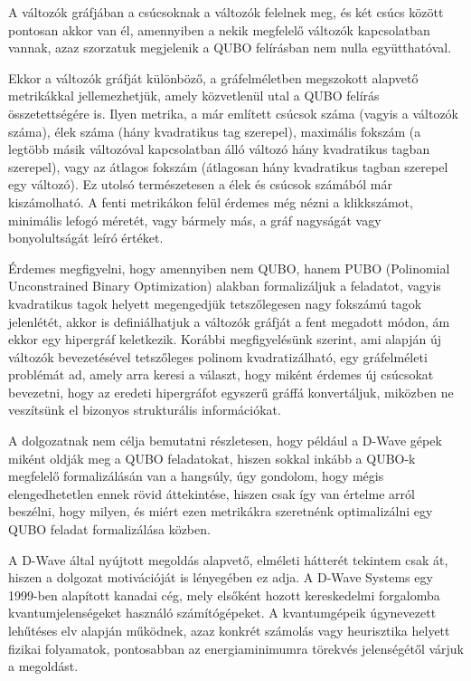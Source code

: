 A változók gráfjában a csúcsoknak a változók felelnek meg, és két csúcs között pontosan akkor van él, amennyiben a nekik megfelelő változók kapcsolatban vannak, azaz szorzatuk megjelenik a QUBO felírásban nem nulla együtthatóval.

Ekkor a változók gráfját különböző, a gráfelméletben megszokott alapvető metrikákkal jellemezhetjük, amely közvetlenül utal a QUBO felírás összetettségére is. Ilyen metrika, a már említett csúcsok száma (vagyis a változók száma), élek száma (hány kvadratikus tag szerepel), maximális fokszám (a legtöbb másik változóval kapcsolatban álló változó hány kvadratikus tagban szerepel), vagy az átlagos fokszám (átlagosan hány kvadratikus tagban szerepel egy változó). Ez utolsó természetesen a élek és csúcsok számából már kiszámolható. A fenti metrikákon felül érdemes még nézni a klikkszámot, minimális lefogó méretét, vagy bármely más, a gráf nagyságát vagy bonyolultságát leíró értéket.

Érdemes megfigyelni, hogy amennyiben nem QUBO, hanem PUBO (Polinomial Unconstrained Binary Optimization) alakban formalizáljuk a feladatot, vagyis kvadratikus tagok helyett megengedjük tetszőlegesen nagy fokszámú tagok jelenlétét, akkor is definiálhatjuk a változók gráfját a fent megadott módon, ám ekkor egy hipergráf keletkezik. Korábbi megfigyelésünk szerint, ami alapján új változók bevezetésével tetszőleges polinom kvadratizálható, egy gráfelméleti problémát ad, amely arra keresi a választ, hogy miként érdemes új csúcsokat bevezetni, hogy az eredeti hipergráfot egyszerű gráffá konvertáljuk, miközben ne veszítsünk el bizonyos strukturális információkat.


A dolgozatnak nem célja bemutatni részletesen, hogy például a D-Wave gépek miként oldják meg a QUBO feladatokat, hiszen sokkal inkább a QUBO-k megfelelő formalizálásán van a hangsúly, úgy gondolom, hogy mégis elengedhetetlen ennek rövid áttekintése, hiszen csak így van értelme arról beszélni, hogy milyen, és miért ezen metrikákra szeretnénk optimalizálni egy QUBO feladat formalizálása közben.

A D-Wave által nyújtott megoldás alapvető, elméleti hátterét tekintem csak át, hiszen a dolgozat motivációját is lényegében ez adja. A D-Wave Systems egy 1999-ben alapított kanadai cég, mely elsőként hozott kereskedelmi forgalomba kvantumjelenségeket használó számítógépeket. A kvantumgépeik úgynevezett lehűtéses elv alapján működnek, azaz konkrét számolás vagy heurisztika helyett fizikai folyamatok, pontosabban az energiaminimumra törekvés jelenségétől várjuk a megoldást. \cite{Szabo}

